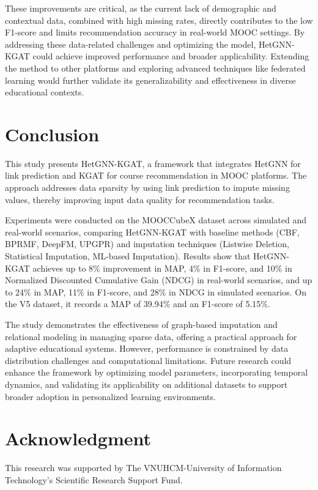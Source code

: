 \documentclass{ieeeaccess}
\begin{document}
These improvements are critical, as the current lack of demographic and contextual data, combined with high missing rates, directly contributes to the low F1-score and limits recommendation accuracy in real-world MOOC settings. By addressing these data-related challenges and optimizing the model, HetGNN-KGAT could achieve improved performance and broader applicability. Extending the method to other platforms and exploring advanced techniques like federated learning would further validate its generalizability and effectiveness in diverse educational contexts.

\section{Conclusion}
\label{sec:conclusion}
This study presents HetGNN-KGAT, a framework that integrates HetGNN for link prediction and KGAT for course recommendation in MOOC platforms. The approach addresses data sparsity by using link prediction to impute missing values, thereby improving input data quality for recommendation tasks.

Experiments were conducted on the MOOCCubeX dataset across simulated and real-world scenarios, comparing HetGNN-KGAT with baseline methods (CBF, BPRMF, DeepFM, UPGPR) and imputation techniques (Listwise Deletion, Statistical Imputation, ML-based Imputation). Results show that HetGNN-KGAT achieves up to 8\% improvement in MAP, 4\% in F1-score, and 10\% in Normalized Discounted Cumulative Gain (NDCG) in real-world scenarios, and up to 24\% in MAP, 11\% in F1-score, and 28\% in NDCG in simulated scenarios. On the V5 dataset, it records a MAP of 39.94\% and an F1-score of 5.15\%.

The study demonstrates the effectiveness of graph-based imputation and relational modeling in managing sparse data, offering a practical approach for adaptive educational systems. However, performance is constrained by data distribution challenges and computational limitations. Future research could enhance the framework by optimizing model parameters, incorporating temporal dynamics, and validating its applicability on additional datasets to support broader adoption in personalized learning environments.

\section*{Acknowledgment}
This research was supported by The VNUHCM-University of Information Technology's Scientific Research Support Fund.
\end{document}
